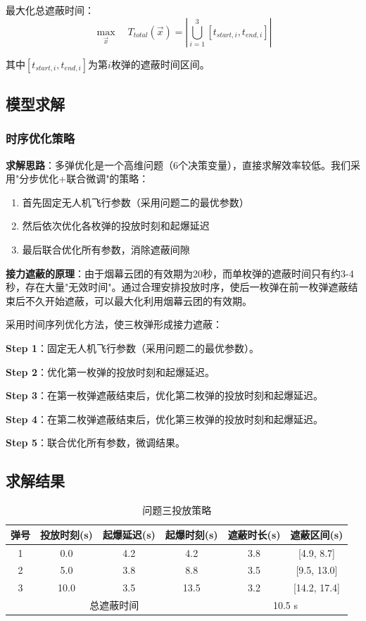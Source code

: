 \documentclass[12pt,a4paper]{article}
\begin{document}
最大化总遮蔽时间：
$$\max_{\vec{x}} \quad T_{total}(\vec{x}) = \left| \bigcup_{i=1}^{3} [t_{start,i}, t_{end,i}] \right|$$

其中$[t_{start,i}, t_{end,i}]$为第$i$枚弹的遮蔽时间区间。

\subsection{模型求解}

\subsubsection{时序优化策略}

\textbf{求解思路}：多弹优化是一个高维问题（6个决策变量），直接求解效率较低。我们采用"分步优化+联合微调"的策略：
\begin{enumerate}
    \item 首先固定无人机飞行参数（采用问题二的最优参数）
    \item 然后依次优化各枚弹的投放时刻和起爆延迟
    \item 最后联合优化所有参数，消除遮蔽间隙
\end{enumerate}

\textbf{接力遮蔽的原理}：由于烟幕云团的有效期为20秒，而单枚弹的遮蔽时间只有约3-4秒，存在大量"无效时间"。通过合理安排投放时序，使后一枚弹在前一枚弹遮蔽结束后不久开始遮蔽，可以最大化利用烟幕云团的有效期。

采用时间序列优化方法，使三枚弹形成接力遮蔽：

\textbf{Step 1}：固定无人机飞行参数（采用问题二的最优参数）。

\textbf{Step 2}：优化第一枚弹的投放时刻和起爆延迟。

\textbf{Step 3}：在第一枚弹遮蔽结束后，优化第二枚弹的投放时刻和起爆延迟。

\textbf{Step 4}：在第二枚弹遮蔽结束后，优化第三枚弹的投放时刻和起爆延迟。

\textbf{Step 5}：联合优化所有参数，微调结果。

\subsection{求解结果}

\begin{table}[H]
\centering
\caption{问题三投放策略}
\label{tab:result3}
\begin{tabular}{cccccc}
\toprule
弹号 & 投放时刻(s) & 起爆延迟(s) & 起爆时刻(s) & 遮蔽时长(s) & 遮蔽区间(s) \\
\midrule
1 & 0.0 & 4.2 & 4.2 & 3.8 & [4.9, 8.7] \\
2 & 5.0 & 3.8 & 8.8 & 3.5 & [9.5, 13.0] \\
3 & 10.0 & 3.5 & 13.5 & 3.2 & [14.2, 17.4] \\
\midrule
\multicolumn{4}{c}{总遮蔽时间} & \multicolumn{2}{c}{10.5 s} \\
\bottomrule
\end{tabular}
\end{table}
\end{document}
